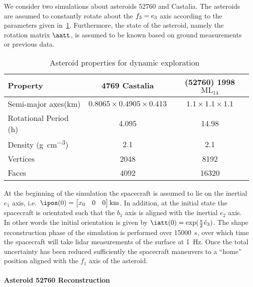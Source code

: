 \documentclass[letterpaper, paper,11pt]{AAS}		%
\begin{document}
We consider two simulations about asteroids \num{52760} and Castalia.
The asteroids are assumed to constantly rotate about the \( f_3 = e_3\) axis according to the parameters given in~\cref{tab:dynamic_asteroids}.
Furthermore, the state of the asteroid, namely the rotation matrix \( \aatt \), is assumed to be known based on ground measurements or previous data.
\begin{table}[htbp]
    \centering
    \begin{tabular}{lcc}
        \toprule
        Property & \num{4769} Castalia & (\num{52760}) \num{1998} \(\text{ML}_{14}\) \\
        \midrule
        Semi-major axes(\si{\kilo\meter}) & \( 0.8065 \times 0.4905 \times 0.413 \) & \( 1.1 \times 1.1 \times 1.1 \) \\
        Rotational Period (\si{\hour}) & \num{4.095} & \num{14.98} \\
        Density (\si{\gram\per\centi\meter^3}) & \num{2.1} & \num{2.1} \\
        Vertices & \num{2048}  & \num{8192} \\
        Faces & \num{4092} & \num{16320} \\
        \bottomrule
    \end{tabular}
    \caption{Asteroid properties for dynamic exploration~\label{tab:dynamic_asteroids}}
\end{table}
At the beginning of the simulation the spacecraft is assumed to lie on the inertial \( e_1 \) axis, i.e.\ \( \ipos(0) = \begin{bmatrix} x_0 & 0 & 0 \end{bmatrix} \si{\kilo\meter} \).
In addition, at the initial state the spacecraft is orientated such that the \( b_1 \) axis is aligned with the inertial \( e_2 \) axis.
In other words the initial orientation is given by \( \iatt(0) = \exp(\frac{\pi}{2} \hat{e}_3)\).
The shape reconstruction phase of the simulation is performed over \SI{15000}{\second}, over which time the spacecraft will take \gls{lidar} measurements of the surface at \SI{1}{\hertz}.
Once the total uncertainty has been reduced sufficiently the spacecraft maneuvers to a ``home'' position aligned with the \( f_1 \) axis of the asteroid.

\paragraph{Asteroid 52760 Reconstruction}
\end{document}
